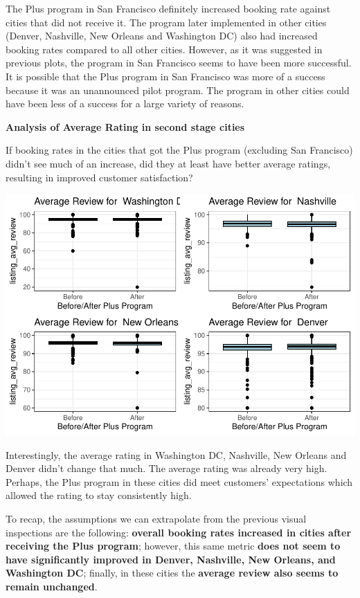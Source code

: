 \documentclass[
  12pt,
]{article}
\begin{document}
The Plus program in San Francisco definitely increased booking rate
against cities that did not receive it. The program later implemented in
other cities (Denver, Nashville, New Orleans and Washington DC) also had
increased booking rates compared to all other cities. However, as it was
suggested in previous plots, the program in San Francisco seems to have
been more successful. It is possible that the Plus program in San
Francisco was more of a success because it was an unannounced pilot
program. The program in other cities could have been less of a success
for a large variety of reasons.

\textbf{Analysis of Average Rating in second stage cities}

If booking rates in the cities that got the Plus program (excluding San
Francisco) didn't see much of an increase, did they at least have better
average ratings, resulting in improved customer satisfaction?

\includegraphics{Group-D---Assignment-1_files/figure-latex/unnamed-chunk-13-1.pdf}

Interestingly, the average rating in Washington DC, Nashville, New
Orleans and Denver didn't change that much. The average rating was
already very high. Perhaps, the Plus program in these cities did meet
customers' expectations which allowed the rating to stay consistently
high.

To recap, the assumptions we can extrapolate from the previous visual
inspections are the following: \textbf{overall booking rates increased
in cities after receiving the Plus program}; however, this same metric
\textbf{does not seem to have significantly improved in Denver,
Nashville, New Orleans, and Washington DC}; finally, in these cities the
\textbf{average review also seems to remain unchanged}.
\end{document}
